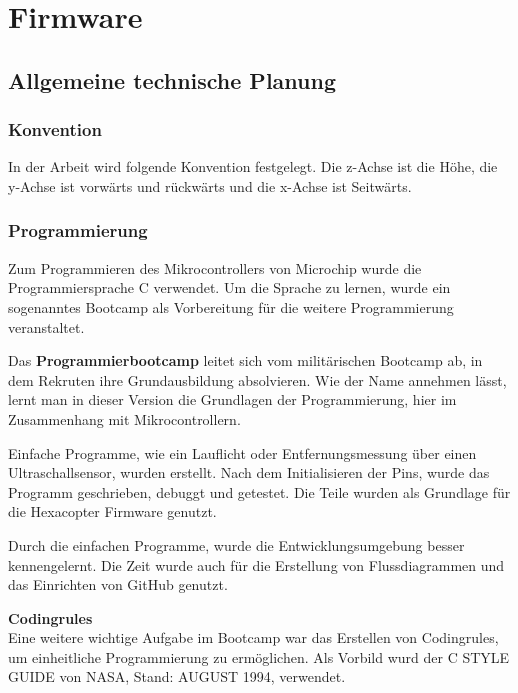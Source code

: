\chapter{Firmware}
\renewcommand{\kapitelautor}{Autor: Christina Bornberg, Lucas Ullrich}

\section{Allgemeine technische Planung}

  \subsection{Konvention}
  In der Arbeit wird folgende Konvention festgelegt. Die z-Achse ist die Höhe, die y-Achse ist vorwärts und rückwärts und die x-Achse ist Seitwärts.

  
  \subsection{Programmierung}
  Zum Programmieren des Mikrocontrollers von Microchip wurde die Programmiersprache C verwendet.
  Um die Sprache zu lernen, wurde ein sogenanntes Bootcamp als Vorbereitung für die weitere Programmierung veranstaltet.

  Das \textbf{Programmierbootcamp} leitet sich vom militärischen Bootcamp ab, in dem Rekruten ihre Grundausbildung absolvieren. Wie der Name annehmen lässt, lernt man in dieser Version die Grundlagen der Programmierung, hier im Zusammenhang mit Mikrocontrollern. 

  Einfache Programme, wie ein Lauflicht oder Entfernungsmessung über einen Ultraschallsensor, wurden erstellt.
  Nach dem Initialisieren der Pins, wurde das Programm geschrieben, debuggt und getestet. 
  Die Teile wurden als Grundlage für die Hexacopter Firmware genutzt.

  Durch die einfachen Programme, wurde die Entwicklungsumgebung besser kennengelernt. Die Zeit wurde auch für die Erstellung von Flussdiagrammen und das Einrichten von GitHub genutzt.

  \textbf{Codingrules}\\
  Eine weitere wichtige Aufgabe im Bootcamp war das Erstellen von Codingrules, um einheitliche Programmierung zu ermöglichen. 
  Als Vorbild wurd der C STYLE GUIDE von NASA, Stand: AUGUST 1994, verwendet. \cite{NasaCGuide}
  
